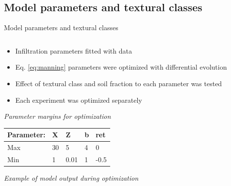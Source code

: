 \subsection{Model parameters and textural classes}
\begin{block}{Model parameters and textural classes}
\begin{columns}
    \begin{column}{0.2\textwidth}
            \begin{itemize}
                \item Infiltration parameters fitted with data
                \item Eq. \ref{eq:manning} parameters were optimized with differential evolution
                \item Effect of textural class and soil fraction to each parameter was tested
                \item Each experiment was optimized separately
            \end{itemize}
            {\it Parameter margins for optimization}
        \begin{table}[]
            \small
            \begin{tabular}{lllll}
            \hline
            \hline
            Parameter: & X & Z & b & ret \\
            \hline
            Max & 30 & 5 & 4 & 0 \\
            Min & 1 & 0.01 & 1 & -0.5 \\
            \hline
            \hline
            \end{tabular}
        \end{table}
        \vspace{1.5cm}
        \justifying
        {\it Example of model output during optimization}
        

\end{column}
\end{columns}
\end{block}

